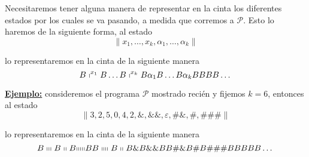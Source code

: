 \begin{frame}
	\PN Necesitaremos tener alguna manera de representar en la cinta los diferentes estados por los cuales se va pasando,
	a medida que corremos a $\mathcal{P}$. Esto lo haremos de la siguiente forma, al estado
	\begin{equation*}
		\lVert x_{1}, \dotsc, x_{k}, \alpha_{1}, \dotsc, \alpha_{k} \rVert
	\end{equation*}

	\PN lo representaremos en la cinta de la siguiente manera
	\begin{equation*}
		B \shortmid^{x_{1}} B \dotsc B \shortmid^{x_{k}} B \alpha_{1} B \dotsc B \alpha_{k} BBBB \dotsc
	\end{equation*}

	\PN \underline{\textbf{Ejemplo:}} consideremos el programa $\mathcal{P}$ mostrado recién y fijemos $k=6$, entonces al
	estado
	\begin{equation*}
		\lVert 3, 2, 5, 0, 4, 2, \&, \&\&, \varepsilon, \#\&, \#, \#\#\# \rVert
	\end{equation*}

	\PN lo representaremos en la cinta de la siguiente manera
	\begin{equation*}
		B \shortmid \shortmid \shortmid B \shortmid \shortmid B\mathrm{\shortmid \shortmid \shortmid \shortmid \shortmid}
		BB \shortmid \shortmid \shortmid \shortmid B \shortmid \shortmid B \& B \&\& BB \#\& B \# B \#\#\# BBBBB \dotsc
	\end{equation*}
\end{frame}
